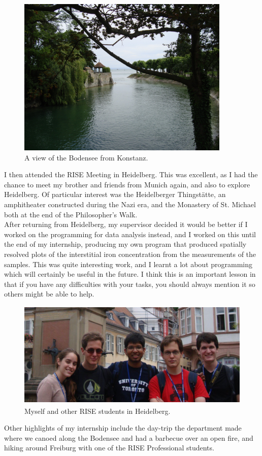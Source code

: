 \documentclass[final,a4paper,oneside,12pt]{article}
\begin{document}
\begin{center}
\begin{figure}[htp]
\centering
\includegraphics[height=3in]{bodensee}
\caption{\label{figure2} A view of the Bodensee from Konstanz.}
\end{figure}
\end{center}
I then attended the RISE Meeting in Heidelberg. This was excellent, as I had the chance to meet my brother and friends from Munich again, and also to explore Heidelberg. Of particular interest was the Heidelberger Thingst\"{a}tte, an amphitheater constructed during the Nazi era, and the Monastery of St. Michael both at the end of the Philosopher's Walk.\\

After returning from Heidelberg, my supervisor decided it would be better if I worked on the programming for data analysis instead, and I worked on this until the end of my internship, producing my own program that produced spatially resolved plots of the interstitial iron concentration from the measurements of the samples. This was quite interesting work, and I learnt a lot about programming which will certainly be useful in the future. I think this is an important lesson in that if you have any difficulties with your tasks, you should always mention it so others might be able to help.\\

\begin{center}
\begin{figure}[htp]
\centering
\includegraphics[height=2in]{heidelberg}
\caption{\label{figure2} Myself and other RISE students in Heidelberg.}
\end{figure}
\end{center}
Other highlights of my internship include the day-trip the department made where we canoed along the Bodensee and had a barbecue over an open fire, and hiking around Freiburg with one of the RISE Professional students.\\
\end{document}
